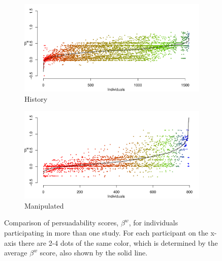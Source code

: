 \documentclass[9pt,a4paper,twocolumn,lineno]{article}
\begin{document}
\begin{figure}
	\centering
	\begin{subfigure}{1\linewidth}
		\centering
		\includegraphics[width=1\linewidth]{beta_history}
		\caption{\footnotesize History}
		\label{fig: betaw history}
	\end{subfigure}
	\begin{subfigure}{1\linewidth}
		\centering
		\includegraphics[width=1\linewidth]{beta_max}
		\caption{\footnotesize Manipulated}
		\label{fig: betaw manipulated}
	\end{subfigure}
	\caption{Comparison of persuadability scores, $\beta^w$, for individuals participating in more than one study. For each participant on the x-axis there are 2-4 dots of the same color, which is determined by the average $\beta^w$ score, also shown by the solid line.}
	\label{fig: betaw comparisons}
\end{figure}

\newpage
\end{document}
